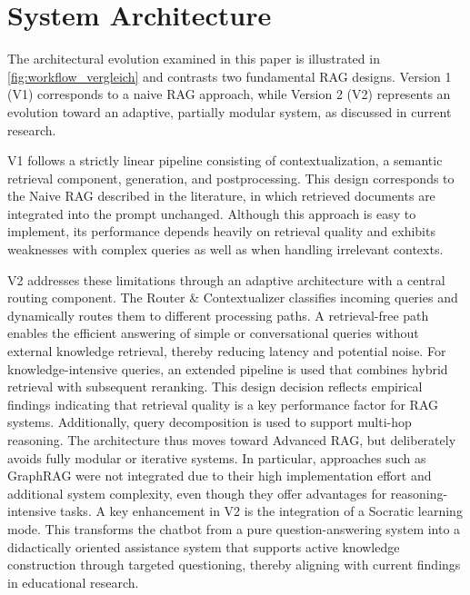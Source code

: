\section{System Architecture}
The architectural evolution examined in this paper is illustrated in \autoref{fig:workflow_vergleich} and contrasts two fundamental RAG designs. Version 1 (V1) corresponds to a naive RAG approach, while Version 2 (V2) represents an evolution toward an adaptive, partially modular system, as discussed in current research.

V1 follows a strictly linear pipeline consisting of contextualization, a semantic retrieval component, generation, and postprocessing. This design corresponds to the Naive RAG described in the literature, in which retrieved documents are integrated into the prompt unchanged. Although this approach is easy to implement, its performance depends heavily on retrieval quality and exhibits weaknesses with complex queries as well as when handling irrelevant contexts.

V2 addresses these limitations through an adaptive architecture with a central routing component. The Router \& Contextualizer classifies incoming queries and dynamically routes them to different processing paths. A retrieval-free path enables the efficient answering of simple or conversational queries without external knowledge retrieval, thereby reducing latency and potential noise. For knowledge-intensive queries, an extended pipeline is used that combines hybrid retrieval with subsequent reranking. This design decision reflects empirical findings indicating that retrieval quality is a key performance factor for RAG systems. Additionally, query decomposition is used to support multi-hop reasoning. The architecture thus moves toward Advanced RAG, but deliberately avoids fully modular or iterative systems. In particular, approaches such as GraphRAG were not integrated due to their high implementation effort and additional system complexity, even though they offer advantages for reasoning-intensive tasks. A key enhancement in V2 is the integration of a Socratic learning mode. This transforms the chatbot from a pure question-answering system into a didactically oriented assistance system that supports active knowledge construction through targeted questioning, thereby aligning with current findings in educational research. 

